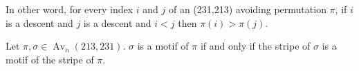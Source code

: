 \documentclass[a4paper]{llncs}
\DeclareMathOperator{\Avd}{Av}
\newcommand\Av[2]{\Avd_{{#1}}({#2})}
\newcommand{\ptext}{\pi}
\newcommand{\pmotif}{\sigma}
\begin{document}
		In other word, for every index $i$ and $j$ of an (231,213) avoiding permutation $\pi$,
		if $i$ is a descent
		and $j$ is a descent
		and $ i<j$
		then $\pi(i)>\pi(j)$.\\

		

		\begin{proposition}
		\label{proposition:patternMatchingStripe}
		Let $\ptext, \pmotif \in \Av{n}{213,231}$.
		$\pmotif$ is a motif of $\ptext$ if and only if the stripe of $\pmotif$ is a motif of the stripe of $\ptext$.
		\end{proposition}
\end{document}
